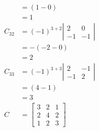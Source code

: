\documentclass[main.tex]{subfiles}
\begin{document}
\begin{enumerate}
$$\begin{aligned}
    &=(1-0) \\
    &=1 \\
    C_{32} &=(-1)^{3+2}\left|\begin{array}{cc}
    2 & 0 \\
    -1 & -1
    \end{array}\right| \\
    &=-(-2-0) \\
    &=2 \\
    C_{33} &=(-1)^{3+3}\left|\begin{array}{cc}
    2 & -1 \\
    -1 & 2
    \end{array}\right| \\
    &=(4-1) \\
    &=3 \\
    C&=\left[\begin{array}{lll}
    3 & 2 & 1 \\
    2 & 4 & 2 \\
    1 & 2 & 3
    \end{array}\right]
    \end{aligned}
    $$
    

\end{enumerate}
\end{document}
